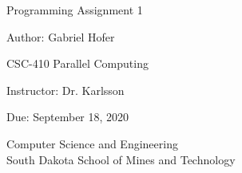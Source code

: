 \documentclass[12pt]{article}
\begin{document}
\begin{titlepage}
   \begin{center}
       \vspace*{1cm}
       \Large
       Programming Assignment 1
       \normalsize

       \vspace{0.5cm}

       Author: Gabriel Hofer

       \vspace{0.5cm}

       CSC-410 Parallel Computing 

       \vspace{0.5cm}

       Instructor: Dr. Karlsson

       \vspace{0.5cm}

       Due: September 18, 2020

       \vfill

       Computer Science and Engineering\\
       South Dakota School of Mines and Technology\\
   \end{center}
\end{titlepage}


\newpage
\end{document}
